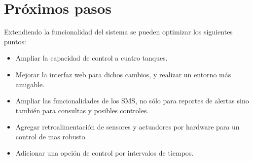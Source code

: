 \section{Próximos pasos}

Extendiendo la funcionalidad del sistema se pueden optimizar los siguientes puntos:
  \begin{itemize}
    \item Ampliar la capacidad de control a cuatro tanques.
    \item Mejorar la interfaz web para dichos cambios, y realizar un entorno más amigable.
    \item Ampliar las funcionalidades de los SMS, no sólo para reportes de alertas sino también para consultas y posibles controles. 
    \item Agregar retroalimentación de sensores y actuadores por hardware para un control de mas robusto.
    \item Adicionar una opción de control por intervalos de tiempos. 
   \end{itemize} 

